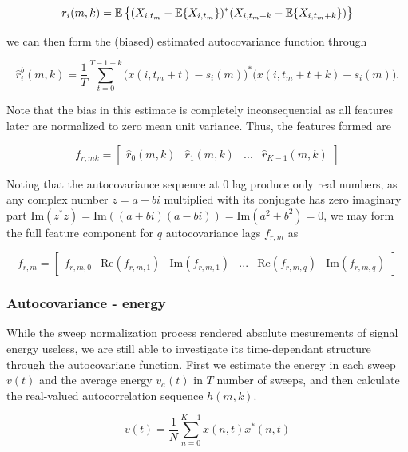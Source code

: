\begin{equation}
	r_i(m, k) = \operatorname*{\mathbb{E}}\big\{(X_{i,t_m} - \operatorname*{\mathbb{E}}\{X_{i,t_m}\})^*(X_{i,t_m+k} - \operatorname*{\mathbb{E}}\{X_{i,t_m+k}\})\big\}
\end{equation}

we can then form the (biased) estimated autocovariance function through

\begin{equation}
	\hat{r}_i^b(m, k) = \frac{1}{T}\sum_{t=0}^{T-1-k}\big(x(i,t_m+t) - s_i(m)\big)^*\big(x(i,t_m+t+k) - s_i(m)\big).
\end{equation}


Note that the bias in this estimate is completely inconsequential as all features later are normalized to zero mean unit variance.  Thus, the features formed are

\begin{equation}
	f_{r,mk} = 
	\begin{bmatrix}
		\hat{r}_0(m,k) & \hat{r}_1(m,k) & ... & \hat{r}_{K-1}(m,k)
	\end{bmatrix}
\end{equation}

Noting that the autocovariance sequence at 0 lag produce only real numbers, as any complex number $z = a + bi$ multiplied with its conjugate has zero imaginary part $\text{Im}(z^*z) = \text{Im}((a + bi)(a - bi)) = \text{Im}(a^2 + b^2) = 0$, we may form the full feature component for $q$ autocovariance lags $f_{r,m}$ as

\begin{equation}
	f_{r,m} = 
	\begin{bmatrix}
		f_{r,m,0} & \text{Re}(f_{r,m,1}) & \text{Im}(f_{r,m,1}) & ... & \text{Re}(f_{r,m,q}) & \text{Im}(f_{r,m,q}) 
	\end{bmatrix}
\end{equation}


\subsubsection{Autocovariance - energy}

While the sweep normalization process rendered absolute mesurements of signal energy useless, we are still able to investigate its time-dependant structure through the autocovariane function. First we estimate the energy in each sweep $v(t)$ and the average energy $v_a(t)$ in $T$ number of sweeps, and then calculate the real-valued autocorrelation sequence $h(m,k)$. 

\begin{equation}
	v(t) = \frac{1}{N}\sum_{n=0}^{K-1}x(n,t)x^*(n,t)
\end{equation}


